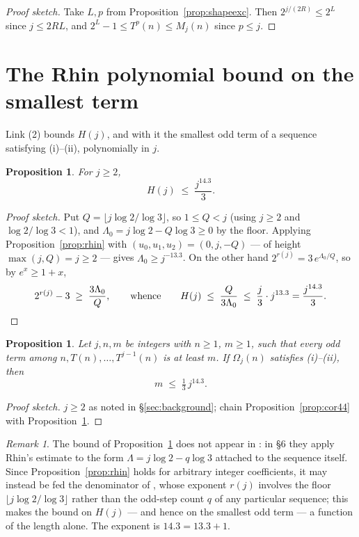 \documentclass[11pt]{amsart}
\theoremstyle{plain}
\newtheorem{proposition}[theorem]{Proposition}
\theoremstyle{definition}
\theoremstyle{remark}
\newtheorem{remark}[theorem]{Remark}
\begin{document}
\begin{proof}[Proof sketch]
Take $L,p$ from Proposition~\ref{prop:shapeexc}.  Then
$2^{j/(2R)}\le 2^{L}$ since $j\le 2RL$, and
$2^{L}-1\le T^{p}(n)\le M_j(n)$ since $p\le j$.
\end{proof}

\section{The Rhin polynomial bound on the smallest term}\label{sec:rhin}

Link (2) bounds $H(j)$, and with it the smallest odd term of a sequence
satisfying (i)--(ii), polynomially in $j$.

\begin{proposition}\label{prop:Hbound}
For $j\ge 2$,
\[
H(j) \;\le\; \frac{j^{14.3}}{3}.
\]
\end{proposition}

\begin{proof}[Proof sketch]
Put $Q=\lfloor j\log 2/\log 3\rfloor$, so $1\le Q<j$ (using $j\ge 2$ and
$\log 2/\log 3<1$), and
$\Lambda_0=j\log 2-Q\log 3\ge 0$ by the floor.  Applying
Proposition~\ref{prop:rhin} with $(u_0,u_1,u_2)=(0,j,-Q)$ --- of height
$\max(j,Q)=j\ge 2$ --- gives $\Lambda_0\ge j^{-13.3}$.  On the other hand
$2^{r(j)}=3\,e^{\Lambda_0/Q}$, so by $e^{x}\ge 1+x$,
\[
2^{r(j)}-3 \;\ge\; \frac{3\Lambda_0}{Q},
\qquad\text{whence}\qquad
H(j)\;\le\;\frac{Q}{3\Lambda_0}\;\le\;\frac{j}{3}\cdot j^{13.3}
=\frac{j^{14.3}}{3}. \qedhere
\]
\end{proof}

\begin{proposition}\label{prop:mbound}
Let $j,n,m$ be integers with $n\ge 1$, $m\ge 1$, such that every odd term
among $n,T(n),\dots,T^{j-1}(n)$ is at least $m$.  If $\Omega_j(n)$ satisfies
(i)--(ii), then
\[
m \;\le\; \tfrac{1}{3}\, j^{14.3}.
\]
\end{proposition}

\begin{proof}[Proof sketch]
$j\ge 2$ as noted in \S\ref{sec:background}; chain
Proposition~\ref{prop:cor44} with Proposition~\ref{prop:Hbound}.
\end{proof}

\begin{remark}\label{rem:route}
The bound of Proposition~\ref{prop:Hbound} does not appear in \cite{Roz25}:
in \S6 they apply Rhin's estimate to the form
$\Lambda=j\log 2-q\log 3$ attached to the sequence itself.  Since
Proposition~\ref{prop:rhin} holds for arbitrary integer coefficients, it may
instead be fed the denominator of \cite[eq.~(12)]{Roz25}, whose exponent
$r(j)$ involves the floor $\lfloor j\log 2/\log 3\rfloor$ rather than the
odd-step count $q$ of any particular sequence; this makes the bound on
$H(j)$ --- and hence on the smallest odd term --- a function of the length
alone.  The exponent is $14.3=13.3+1$.
\end{remark}
\end{document}
